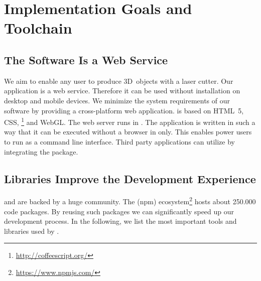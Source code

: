 \documentclass[../ClassicThesis.tex]{subfiles}
\begin{document}
\chapter{Implementation Goals and Toolchain}
\label{ch:toolchain}

\section{The Software Is a Web Service}

We aim to enable any user to produce 3D~objects with a laser
cutter. Our application {\platener} is a web service.
Therefore it can be used without installation on desktop and
mobile devices. We minimize the system requirements of our
software by providing a cross-platform web application.
{\platener} is based on HTML~5, CSS,
{\coffeescript}\footnote{\url{http://coffeescript.org/}} and
WebGL. The web server runs in {\nodejs}. The application is
written in such a way that it can be executed without a
browser in {\nodejs} only. This enables power users to run
{\platener} as a command line interface. Third party
applications can utilize {\platener} by integrating the
{\nodejs} package.

\section{Libraries Improve the Development Experience}

{\javascript} and {\nodejs} are backed by a huge community.
The  (npm)
ecosystem\footnote{\url{https://www.npmjs.com/}} hosts about
250.000 code packages. By reusing such packages we can
significantly speed up our development process. In the
following, we list the most important tools and libraries
used by {\platener}.
\end{document}
